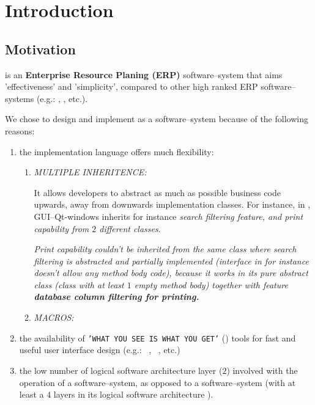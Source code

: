 \chapter{Introduction}

\section{Motivation}

\yerotherpblack is an \textbf{Enterprise Resource Planing (ERP)}
software--system that aims 'effectiveness' and 'simplicity',
compared to other high ranked ERP software--systems
(e.g.: \sageerp, \saperp, etc.).

We chose to design and implement \yerotherpblack as
a \thickclient software--system because of the
following reasons:

\begin{enumerate}[1.]

	\item the implementation language \cplusplus
		offers much flexibility:
		
		\begin{enumerate}[1.]
			\item \emph{MULTIPLE INHERITENCE:}
			
			It allows developers to abstract as much as possible
			business code upwards, away from downwards implementation
			classes. For instance,  in \yerotherpblack,
			GUI--Qt-windows inherits for instance
			\emph{search filtering feature, and print capability
			from $2$ different classes}.

			\emph{Print capability couldn't be inherited from the
			same class where search filtering is abstracted and
			partially implemented (interface in \Java for instance
			doesn't allow any method body code), because it works
			in its pure abstract class (\cplusplus class with at
			least $1$ empty method body) together with feature
			\textbf{database column filtering for printing.}}
			\newline
			
			\emph{}
		
			\item \emph{MACROS:}
		\end{enumerate}						
		
	\item the availability of \texttt{'WHAT YOU SEE IS WHAT YOU GET'}
		(\wy) tools for fast and useful
		user interface design (e.g.: \qtdesigner~\cite{qtdesigner:2020},
		\ministudio~\cite{miniStudio:2020}, etc.)
		
	\item the low number of logical software architecture
		layer ($2$) involved with the operation
		of a \thickclient software--system,	as opposed
		to a \webbrowserbased software--system
		(with at least a $4$ layers in its 
		logical software architecture ).
	
\end{enumerate}


